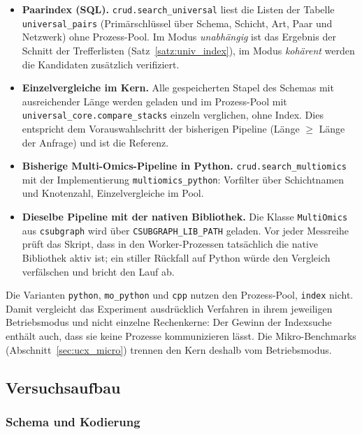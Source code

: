\begin{itemize}
	\item[\texttt{index}] \textbf{Paarindex (SQL).} \texttt{crud.search\_universal} liest die Listen der Tabelle \texttt{universal\_pairs} (Primärschlüssel über Schema, Schicht, Art, Paar und Netzwerk) ohne Prozess-Pool. Im Modus \emph{unabhängig} ist das Ergebnis der Schnitt der Trefferlisten (Satz~\ref{satz:univ_index}), im Modus \emph{kohärent} werden die Kandidaten zusätzlich verifiziert.
	\item[\texttt{python}] \textbf{Einzelvergleiche im Kern.} Alle gespeicherten Stapel des Schemas mit ausreichender Länge werden geladen und im Prozess-Pool mit \texttt{universal\_core.compare\_stacks} einzeln verglichen, ohne Index. Dies entspricht dem Vorauswahlschritt der bisherigen Pipeline (Länge $\ge$ Länge der Anfrage) und ist die Referenz.
	\item[\texttt{mo\_python}] \textbf{Bisherige Multi-Omics-Pipeline in Python.} \texttt{crud.search\_multiomics} mit der Implementierung \texttt{multiomics\_python}: Vorfilter über Schichtnamen und Knotenzahl, Einzelvergleiche im Pool.
	\item[\texttt{cpp}] \textbf{Dieselbe Pipeline mit der nativen Bibliothek.} Die Klasse \texttt{MultiOmics} aus \texttt{csubgraph} wird über \texttt{CSUBGRAPH\_LIB\_PATH} geladen. Vor jeder Messreihe prüft das Skript, dass in den Worker-Prozessen tatsächlich die native Bibliothek aktiv ist; ein stiller Rückfall auf Python würde den Vergleich verfälschen und bricht den Lauf ab.
\end{itemize}

Die Varianten \texttt{python}, \texttt{mo\_python} und \texttt{cpp} nutzen den Prozess-Pool, \texttt{index} nicht. Damit vergleicht das Experiment ausdrücklich Verfahren in ihrem jeweiligen Betriebsmodus und nicht einzelne Rechenkerne: Der Gewinn der Indexsuche enthält auch, dass sie keine Prozesse kommunizieren lässt. Die Mikro-Benchmarks (Abschnitt~\ref{sec:ucx_micro}) trennen den Kern deshalb vom Betriebsmodus.

\subsection{Versuchsaufbau}
\label{sec:ucx_aufbau}

\subsubsection{Schema und Kodierung}


